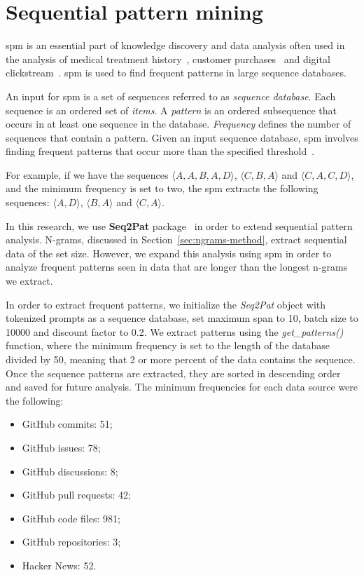 \section{Sequential pattern mining}
\Acrfull{spm} is an essential part of knowledge discovery and data analysis often used in the analysis of medical treatment history~\cite{bou2018medical}, customer purchases~\cite{agrawal1995mining} and digital clickstream~\cite{requena2020shopper}. \Acrshort{spm} is used to find frequent patterns in large sequence databases.

An input for \acrshort{spm} is a set of sequences referred to as \textit{sequence database}. Each sequence is an ordered set of \textit{items}. A \textit{pattern} is an ordered subsequence that occurs in at least one sequence in the database. \textit{Frequency} defines the number of sequences that contain a pattern. Given an input sequence database, \acrshort{spm} involves finding frequent patterns that occur more than the specified threshold~\cite{seq2pat}.

For example, if we have the sequences $\langle A, A, B, A, D \rangle$, $\langle C, B, A \rangle$ and $\langle C, A, C, D \rangle$, and the minimum frequency is set to two, the \acrshort{spm} extracts the following sequences: $\langle A, D \rangle$, $\langle B, A \rangle$ and $\langle C, A \rangle$.

In this research, we use \textbf{Seq2Pat} package~\cite{seq2pat2022} in order to extend sequential pattern analysis. N-grams, discussed in Section~\ref{sec:ngrams-method}, extract sequential data of the set size. However, we expand this analysis using \acrshort{spm} in order to analyze frequent patterns seen in data that are longer than the longest n-grams we extract. 

In order to extract frequent patterns, we initialize the \textit{Seq2Pat} object with tokenized prompts as a sequence database, set maximum span to 10, batch size to 10000 and discount factor to 0.2. We extract patterns using the \textit{get\_patterns()} function, where the minimum frequency is set to the length of the database divided by 50, meaning that 2 or more percent of the data contains the sequence. Once the sequence patterns are extracted, they are sorted in descending order and saved for future analysis. The minimum frequencies for each data source were the following:

\begin{itemize}
    \item GitHub commits: 51;
    \item GitHub issues: 78;
    \item GitHub discussions: 8;
    \item GitHub pull requests: 42;
    \item GitHub code files: 981;
    \item GitHub repositories: 3;
    \item Hacker News: 52.
\end{itemize}


